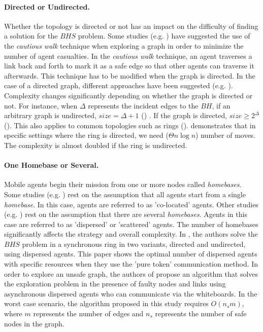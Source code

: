 \paragraph{Directed or Undirected.}
Whether the topology is directed or not has an impact on the difficulty of finding a solution for the $BHS$ problem. Some studies (e.g. \cite{dobetal8,dobetal6,czyetal1,dobetal7})  have suggested the use of the {\em cautious walk} technique when exploring a graph in order to minimize the number of agent casualties. In the {\em cautious walk} technique,  an agent traverses a link back and forth to mark it as a safe edge so that other agents can traverse it afterwards. This technique has to be  modified when the graph is directed. In the case of a directed graph, different approaches have been suggested (e.g. \cite{kosetal15,czyetal2,dobetal8}).
Complexity changes significantly depending on whether the graph is directed or not. For instance, when $\Delta$ represents the incident edges to the $BH$, if  an arbitrary graph is undirected, $size= \Delta+1$ (\cite{dobetal7}) . If the graph is directed, $size\ge2^{\Delta} $ (\cite{czyetal2}). This also applies to common topologies such as rings  (\cite{dobetal8}). \cite{dobetal8} demonstrates that in specific settings where the ring is directed, we need ($\Theta n \log n$) number of moves. The complexity is almost doubled if the ring is undirected.

\paragraph{One  Homebase or Several. }
Mobile agents begin their mission from one or more nodes called {\em homebases}. Some studies (e.g. \cite{dobetal8,dobetal3,dobetal7,czyetal1,czyetal2,kosetal15}) rest on the assumption that all agents start from a single {\em homebase}. In this case, agents are referred to as  'co-located' agents. Other studies (e.g. \cite{dobetal7,chaetal12,floetal10,floetal11}) rest on the assumption that there are several {\em homebases}. Agents in this case are referred to as  'dispersed' or 'scattered' agents. The number of homebases significantly affects the strategy and overall complexity. In \cite{chaetal12}, the authors solve the $BHS$ problem in a synchronous ring in two variants, directed and undirected, using dispersed agents. This paper shows the optimal number of dispersed agents with specific resources when they use the 'pure token' communication method. In order to explore an unsafe graph, the authors of \cite{floetal10} propose an algorithm that solves the exploration problem in the presence of faulty nodes and links using asynchronous dispersed agents who can communicate via the whiteboards. In the worst case scenario, the algorithm proposed in this study requires $O(n_sm)$, where $m$ represents the number of edges and $n_s$ represents the number of safe nodes in the graph.


